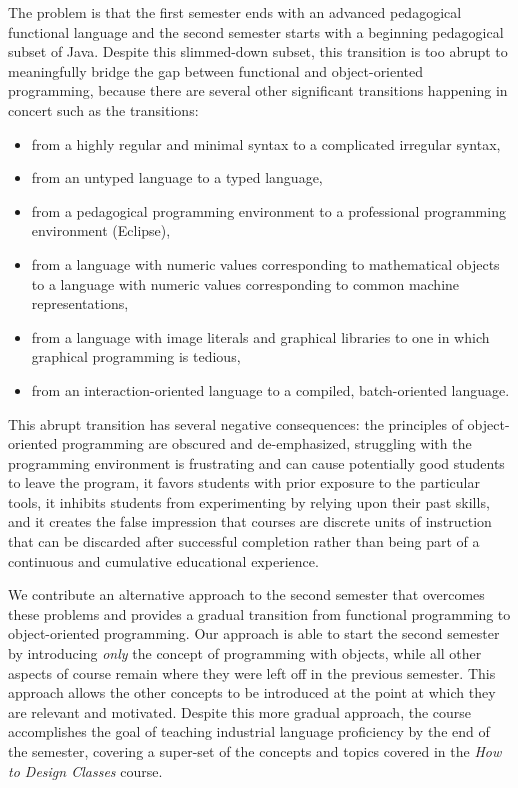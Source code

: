 \documentclass[submission,copyright]{eptcs}
\begin{document}
The problem is that the first semester ends with an advanced
pedagogical functional language and the second semester starts with a
beginning pedagogical subset of Java.  Despite this slimmed-down
subset, this transition is too abrupt to meaningfully bridge the gap
between functional and object-oriented programming, because there are
several other significant transitions happening in concert such as the
transitions:
\begin{itemize}
\item from a highly regular and minimal syntax to a complicated
  irregular syntax,

\item from an untyped language to a typed language,

\item from a pedagogical programming environment to a professional
programming environment (Eclipse),

\item from a language with numeric values corresponding to
  mathematical objects to a language with numeric values corresponding
  to common machine representations,

\item from a language with image literals and graphical libraries to
  one in which graphical programming is tedious,

\item from an interaction-oriented language to a compiled,
  batch-oriented language.  
\end{itemize}

This abrupt transition has several negative consequences: the
principles of object-oriented programming are obscured and
de-emphasized, struggling with the programming environment is
frustrating and can cause potentially good students to leave the
program, it favors students with prior exposure to the particular
tools, it inhibits students from experimenting by relying upon their
past skills, and it creates the false impression that courses are
discrete units of instruction that can be discarded after successful
completion rather than being part of a continuous and cumulative
educational experience.


We contribute an alternative approach to the second semester that
overcomes these problems and provides a gradual transition from
functional programming to object-oriented programming.  Our approach
is able to start the second semester by introducing \emph{only} the
concept of programming with objects, while all other aspects of course
remain where they were left off in the previous semester.  This
approach allows the other concepts to be introduced at the point at
which they are relevant and motivated.  Despite this more gradual
approach, the course accomplishes the goal of teaching industrial
language proficiency by the end of the semester, covering a super-set
of the concepts and topics covered in the \emph{How to Design Classes}
course.
\end{document}
